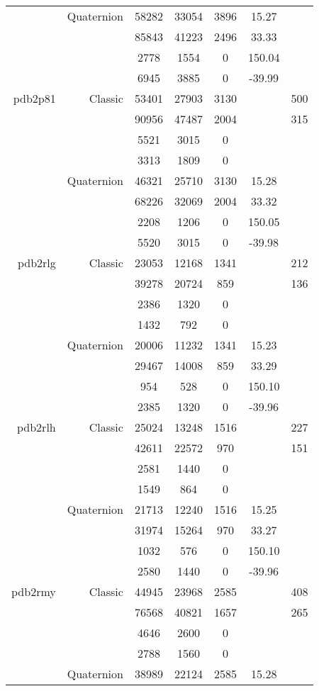 \begin{xltabular}{\textwidth}{r|rcccSc}
& Quaternion & 58282 & 33054 & 3896 & 15.27 & \\
& & 85843 & 41223 & 2496 & 33.33 & \\
& & 2778 & 1554 & 0 & 150.04 & \\
& & 6945 & 3885 & 0 & -39.99 & \\ \addlinespace
pdb2p81 & Classic & 53401 & 27903 & 3130 & & 500 \\
& & 90956 & 47487 & 2004 & & 315 \\
& & 5521 & 3015 & 0 & & \\
& & 3313 & 1809 & 0 & & \\
& Quaternion & 46321 & 25710 & 3130 & 15.28 & \\
& & 68226 & 32069 & 2004 & 33.32 & \\
& & 2208 & 1206 & 0 & 150.05 & \\
& & 5520 & 3015 & 0 & -39.98 & \\ \addlinespace
pdb2rlg & Classic & 23053 & 12168 & 1341 & & 212 \\
& & 39278 & 20724 & 859 & & 136 \\
& & 2386 & 1320 & 0 & & \\
& & 1432 & 792 & 0 & & \\
& Quaternion & 20006 & 11232 & 1341 & 15.23 & \\
& & 29467 & 14008 & 859 & 33.29 & \\
& & 954 & 528 & 0 & 150.10 & \\
& & 2385 & 1320 & 0 & -39.96 & \\ \addlinespace
pdb2rlh & Classic & 25024 & 13248 & 1516 & & 227 \\
& & 42611 & 22572 & 970 & & 151 \\
& & 2581 & 1440 & 0 & & \\
& & 1549 & 864 & 0 & & \\
& Quaternion & 21713 & 12240 & 1516 & 15.25 & \\
& & 31974 & 15264 & 970 & 33.27 & \\
& & 1032 & 576 & 0 & 150.10 & \\
& & 2580 & 1440 & 0 & -39.96 & \\ \addlinespace
pdb2rmy & Classic & 44945 & 23968 & 2585 & & 408 \\
& & 76568 & 40821 & 1657 & & 265 \\
& & 4646 & 2600 & 0 & & \\
& & 2788 & 1560 & 0 & & \\
& Quaternion & 38989 & 22124 & 2585 & 15.28 & \\

\end{xltabular}
